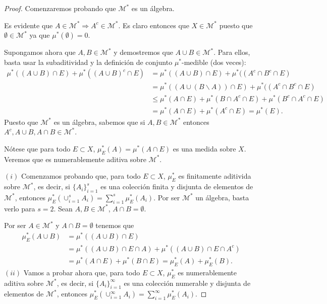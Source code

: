 \begin{proof}
    Comenzaremos probando que $\mathcal{M}^*$ es un álgebra.

    Es evidente que $A \in \mathcal{M}^* \Longrightarrow A^c \in \mathcal{M}^*$. Es claro entonces que $X \in \mathcal{M}^*$ puesto que $\emptyset \in \mathcal{M}^*$ ya que $\mu^*(\emptyset) = 0$.

    Supongamos ahora que $A, B \in \mathcal{M}^*$ y demostremos que $A \cup B \in \mathcal{M}^*$. Para ellos, basta usar la subaditividad y la definición de conjunto $\mu^*$-medible (dos veces):
    \begin{align*}
        \mu^*((A \cup B) \cap E) + \mu^*((A \cup B)^c \cap E ) & = \mu^*((A \cup B) \cap E) + \mu^*((A^c \cap B^c \cap E )                    \\
                                                               & = \mu^*((A \cup (B \backslash A)) \cap E) + \mu^*((A^c \cap B^c \cap E )     \\
                                                               & \leq \mu^*(A \cap E) + \mu^*(B \cap A^c \cap E) + \mu^*(B^c \cap A^c \cap E) \\
                                                               & = \mu^*(A \cap E) + \mu^*(A^c \cap E) = \mu^*(E).
    \end{align*}
    Puesto que $\mathcal{M}^*$ es un álgebra, sabemos que si $A, B \in \mathcal{M}^*$ entonces $A^c, A \cup B, A \cap B \in \mathcal{M}^*$.

    Nótese que para todo $E \subset X$, $\mu_E^*(A) = \mu^*(A \cap E)$ es una medida sobre $X$. Veremos que es numerablemente aditiva sobre $\mathcal{M}^*$.

    $(i)$ Comenzamos probando que, para todo $E \subset X$, $\mu_E^*$ es finitamente aditivida sobre $\mathcal{M}^*$, es decir, si $\{A_i\}_{i=1}^{s}$ es una colección finita y disjunta de elementos de $\mathcal{M}^*$, entonces $\mu_E^*(\cup_{i=1}^{s}{A_i}) = \sum_{i=1}^{s}{\mu_E^*(A_i)}$. Por ser $\mathcal{M}^*$ un álgebra, basta verlo para $s = 2$. Sean $A, B \in \mathcal{M}^*$, $A \cap B = \emptyset$.

    Por ser $A \in \mathcal{M}^*$ y $A \cap B = \emptyset$ tenemos que
    \begin{align*}
        \mu_E^*(A \cup B) & = \mu^*((A \cup B) \cap E)                                           \\
                          & = \mu^*((A \cup B)\cap E \cap A) + \mu^*((A \cup B) \cap E \cap A^c) \\
                          & = \mu^*(A \cap E) + \mu^*(B \cap E) = \mu_E^*(A) + \mu_E^*(B).
    \end{align*}
    $(ii)$ Vamos a probar ahora que, para todo $E \subset X$, $\mu_E^*$ es numerablemente aditiva sobre $\mathcal{M}^*$, es decir,  si $\{A_i\}_{i=1}^{\infty}$ es una colección numerable y disjunta de elementos de $\mathcal{M}^*$, entonces $\mu_E^*(\cup_{i=1}^{\infty}{A_i}) = \sum_{i=1}^{\infty}{\mu_E^*(A_i)}$.


\end{proof}
